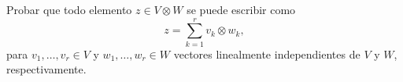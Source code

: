 \item Probar que todo elemento $z\in V\otimes W$ se puede escribir como\[z=\sum_{k=1}^rv_k\otimes w_k,\]
    para $v_1,\dots,v_r\in V$ y $w_1,\dots,w_r\in W$ vectores linealmente independientes de $V$ y $W$, respectivamente.
    \begin{mdframed}[style=s]
        
    \end{mdframed}